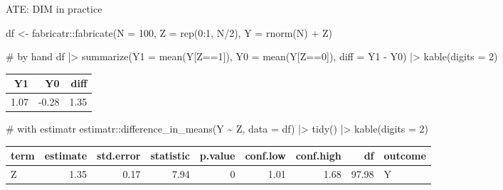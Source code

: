 \documentclass[
  11pt,
  ignorenonframetext,
]{beamer}
\newenvironment{Shaded}{\begin{snugshade}}{\end{snugshade}}
\newcommand{\AttributeTok}[1]{\textcolor[rgb]{0.40,0.45,0.13}{#1}}
\newcommand{\CommentTok}[1]{\textcolor[rgb]{0.37,0.37,0.37}{#1}}
\newcommand{\DecValTok}[1]{\textcolor[rgb]{0.68,0.00,0.00}{#1}}
\newcommand{\FunctionTok}[1]{\textcolor[rgb]{0.28,0.35,0.67}{#1}}
\newcommand{\NormalTok}[1]{\textcolor[rgb]{0.00,0.23,0.31}{#1}}
\newcommand{\OtherTok}[1]{\textcolor[rgb]{0.00,0.23,0.31}{#1}}
\newcommand{\SpecialCharTok}[1]{\textcolor[rgb]{0.37,0.37,0.37}{#1}}
\begin{document}
\begin{frame}[fragile]{ATE: DIM in practice}
\protect\hypertarget{ate-dim-in-practice}{}
\begin{Shaded}
\begin{Highlighting}[]
\NormalTok{df }\OtherTok{\textless{}{-}}\NormalTok{ fabricatr}\SpecialCharTok{::}\FunctionTok{fabricate}\NormalTok{(}\AttributeTok{N =} \DecValTok{100}\NormalTok{, }\AttributeTok{Z =} \FunctionTok{rep}\NormalTok{(}\DecValTok{0}\SpecialCharTok{:}\DecValTok{1}\NormalTok{, N}\SpecialCharTok{/}\DecValTok{2}\NormalTok{), }\AttributeTok{Y =} \FunctionTok{rnorm}\NormalTok{(N) }\SpecialCharTok{+}\NormalTok{ Z)}

\CommentTok{\# by hand}
\NormalTok{df }\SpecialCharTok{|\textgreater{}}
  \FunctionTok{summarize}\NormalTok{(}\AttributeTok{Y1 =} \FunctionTok{mean}\NormalTok{(Y[Z}\SpecialCharTok{==}\DecValTok{1}\NormalTok{]), }
            \AttributeTok{Y0 =} \FunctionTok{mean}\NormalTok{(Y[Z}\SpecialCharTok{==}\DecValTok{0}\NormalTok{]), }
            \AttributeTok{diff =}\NormalTok{ Y1 }\SpecialCharTok{{-}}\NormalTok{ Y0) }\SpecialCharTok{|\textgreater{}} \FunctionTok{kable}\NormalTok{(}\AttributeTok{digits =} \DecValTok{2}\NormalTok{)}
\end{Highlighting}
\end{Shaded}

\begin{tabular}{r|r|r}
\hline
Y1 & Y0 & diff\\
\hline
1.07 & -0.28 & 1.35\\
\hline
\end{tabular}

\begin{Shaded}
\begin{Highlighting}[]
\CommentTok{\# with estimatr}
\NormalTok{estimatr}\SpecialCharTok{::}\FunctionTok{difference\_in\_means}\NormalTok{(Y }\SpecialCharTok{\textasciitilde{}}\NormalTok{ Z, }\AttributeTok{data =}\NormalTok{ df) }\SpecialCharTok{|\textgreater{}}
  \FunctionTok{tidy}\NormalTok{() }\SpecialCharTok{|\textgreater{}} \FunctionTok{kable}\NormalTok{(}\AttributeTok{digits =} \DecValTok{2}\NormalTok{)}
\end{Highlighting}
\end{Shaded}

\begin{tabular}{l|r|r|r|r|r|r|r|l}
\hline
term & estimate & std.error & statistic & p.value & conf.low & conf.high & df & outcome\\
\hline
Z & 1.35 & 0.17 & 7.94 & 0 & 1.01 & 1.68 & 97.98 & Y\\
\hline
\end{tabular}
\end{frame}
\end{document}
